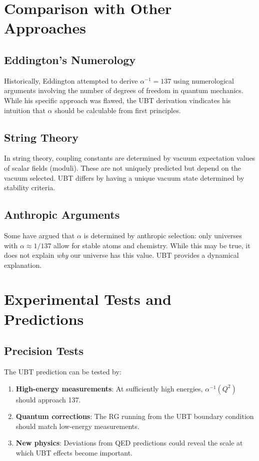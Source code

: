 \documentclass[12pt, a4paper]{article}
\theoremstyle{definition}
\theoremstyle{remark}
\begin{document}
\section{Comparison with Other Approaches}

\subsection{Eddington's Numerology}

Historically, Eddington attempted to derive $\alpha^{-1} = 137$ using numerological arguments involving the number of degrees of freedom in quantum mechanics. While his specific approach was flawed, the UBT derivation vindicates his intuition that $\alpha$ should be calculable from first principles.

\subsection{String Theory}

In string theory, coupling constants are determined by vacuum expectation values of scalar fields (moduli). These are not uniquely predicted but depend on the vacuum selected. UBT differs by having a unique vacuum state determined by stability criteria.

\subsection{Anthropic Arguments}

Some have argued that $\alpha$ is determined by anthropic selection: only universes with $\alpha \approx 1/137$ allow for stable atoms and chemistry. While this may be true, it does not explain \emph{why} our universe has this value. UBT provides a dynamical explanation.

\section{Experimental Tests and Predictions}

\subsection{Precision Tests}

The UBT prediction can be tested by:
\begin{enumerate}
\item \textbf{High-energy measurements}: At sufficiently high energies, $\alpha^{-1}(Q^2)$ should approach 137.

\item \textbf{Quantum corrections}: The RG running from the UBT boundary condition should match low-energy measurements.

\item \textbf{New physics}: Deviations from QED predictions could reveal the scale at which UBT effects become important.
\end{enumerate}
\end{document}
